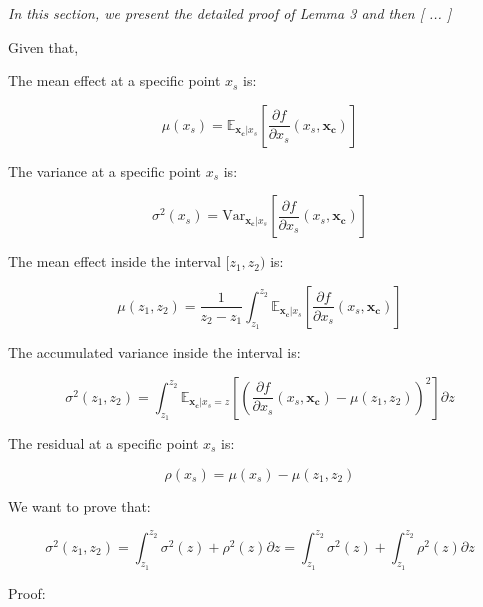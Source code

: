\documentclass[twoside]{article}
\newcommand{\dfdx}{\frac{\partial f}{\partial x_s}}
\newcommand{\xc}{\mathbf{x_c}}
\begin{document}
\textit{In this section, we present the detailed proof of Lemma 3 and then [ ... ]}


Given that,

The mean effect at a specific point \(x_s\) is:

\begin{equation}
  \label{eq:3}
  \mu(x_s) = \mathbb{E}_{\xc|x_s}\left [\dfdx (x_s, \xc) \right ]
\end{equation}


The variance at a specific point \(x_s\) is:

\begin{equation}
  \label{eq:3}
  \sigma^2(x_s) = \mathrm{Var}_{\xc|x_s}\left [\dfdx (x_s, \xc) \right ]
\end{equation}


The mean effect inside the interval \([z_1, z_2)\) is:

\begin{equation}
  \label{eq:1}
  \mu(z_1, z_2) = \frac{1}{z_2-z_1} \int_{z_1}^{z_2} \mathbb{E}_{\xc|x_s}\left [\dfdx (x_s, \xc)\right ]
\end{equation}

The accumulated variance inside the interval is:

\begin{equation}
  \label{eq:2}
  \sigma^2(z_1, z_2) = \int_{z_1}^{z_2} \mathbb{E}_{\xc|x_s=z} \left [ \left ( \frac{\partial f}{\partial x_s}(x_s, \xc) - \mu(z_1, z_2) \right )^2 \right] \partial z
\end{equation}


The residual at a specific point \(x_s\) is:

\begin{equation}
  \label{eq:4}
  \rho(x_s) = \mu(x_s) - \mu(z_1, z_2)
\end{equation}


We want to prove that:

\begin{equation}
  \label{eq:5}
  \sigma^2(z_1, z_2) = \int_{z_1}^{z_2} \sigma^2(z) + \rho^2(z) \partial z
  = \int_{z_1}^{z_2} \sigma^2(z) + \int_{z_1}^{z_2} \rho^2(z) \partial z
\end{equation}

Proof:
\end{document}
